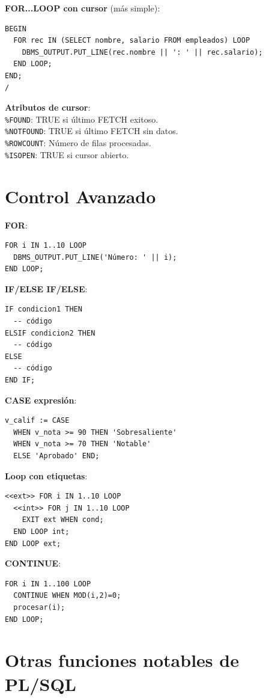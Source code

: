 \documentclass[8pt,a4paper,twocolumn]{article}
\begin{document}
\textbf{FOR...LOOP con cursor} (más simple):
\begin{lstlisting}
BEGIN
  FOR rec IN (SELECT nombre, salario FROM empleados) LOOP
    DBMS_OUTPUT.PUT_LINE(rec.nombre || ': ' || rec.salario);
  END LOOP;
END;
/
\end{lstlisting}

\textbf{Atributos de cursor}:\\
\texttt{\%FOUND}: TRUE si último FETCH exitoso.\\
\texttt{\%NOTFOUND}: TRUE si último FETCH sin datos.\\
\texttt{\%ROWCOUNT}: Número de filas procesadas.\\
\texttt{\%ISOPEN}: TRUE si cursor abierto.

\section{Control Avanzado}

\textbf{FOR}:
\begin{lstlisting}
FOR i IN 1..10 LOOP
  DBMS_OUTPUT.PUT_LINE('Número: ' || i);
END LOOP;
\end{lstlisting}

\textbf{IF/ELSE IF/ELSE}:
\begin{lstlisting}
IF condicion1 THEN
  -- código
ELSIF condicion2 THEN
  -- código
ELSE
  -- código
END IF;
\end{lstlisting}

\textbf{CASE expresión}:
\begin{lstlisting}
v_calif := CASE
  WHEN v_nota >= 90 THEN 'Sobresaliente'
  WHEN v_nota >= 70 THEN 'Notable'
  ELSE 'Aprobado' END;
\end{lstlisting}

\textbf{Loop con etiquetas}:
\begin{lstlisting}
<<ext>> FOR i IN 1..10 LOOP
  <<int>> FOR j IN 1..10 LOOP
    EXIT ext WHEN cond;
  END LOOP int;
END LOOP ext;
\end{lstlisting}

\textbf{CONTINUE}:
\begin{lstlisting}
FOR i IN 1..100 LOOP
  CONTINUE WHEN MOD(i,2)=0;
  procesar(i);
END LOOP;
\end{lstlisting}

\section{Otras funciones notables de PL/SQL}
\end{document}
